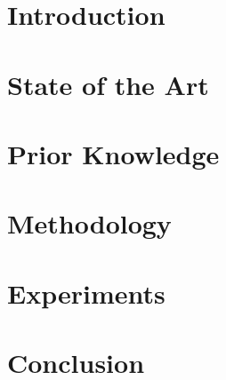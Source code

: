 \documentclass[a4paper]{report}
\begin{document}




\tableofcontents

\listoffigures

\chapter{Introduction}



\chapter{State of the Art}



\chapter{Prior Knowledge}



\chapter{Methodology}



\chapter{Experiments}

\chapter{Conclusion}

\appendix

%




\end{document}
